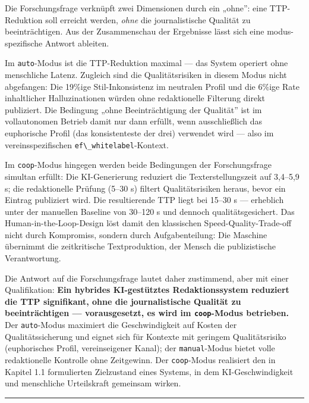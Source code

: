 Die Forschungsfrage verknüpft zwei Dimensionen durch ein „ohne'': eine
TTP-Reduktion soll erreicht werden, \emph{ohne} die journalistische
Qualität zu beeinträchtigen. Aus der Zusammenschau der Ergebnisse lässt
sich eine modus-spezifische Antwort ableiten.

Im \passthrough{\lstinline!auto!}-Modus ist die TTP-Reduktion maximal
--- das System operiert ohne menschliche Latenz. Zugleich sind die
Qualitätsrisiken in diesem Modus nicht abgefangen: Die 19\%ige
Stil-Inkonsistenz im neutralen Profil und die 6\%ige Rate inhaltlicher
Halluzinationen würden ohne redaktionelle Filterung direkt publiziert.
Die Bedingung „ohne Beeinträchtigung der Qualität'' ist im vollautonomen
Betrieb damit nur dann erfüllt, wenn ausschließlich das euphorische
Profil (das konsistenteste der drei) verwendet wird --- also im
vereinsspezifischen \passthrough{\lstinline!ef\_whitelabel!}-Kontext.

Im \passthrough{\lstinline!coop!}-Modus hingegen werden beide
Bedingungen der Forschungsfrage simultan erfüllt: Die KI-Generierung
reduziert die Texterstellungszeit auf 3,4--5,9 s; die redaktionelle
Prüfung (5--30 s) filtert Qualitätsrisiken heraus, bevor ein Eintrag
publiziert wird. Die resultierende TTP liegt bei 15--30 s --- erheblich
unter der manuellen Baseline von 30--120 s und dennoch
qualitätsgesichert. Das Human-in-the-Loop-Design löst damit den
klassischen Speed-Quality-Trade-off nicht durch Kompromiss, sondern
durch Aufgabenteilung: Die Maschine übernimmt die zeitkritische
Textproduktion, der Mensch die publizistische Verantwortung.

Die Antwort auf die Forschungsfrage lautet daher zustimmend, aber mit
einer Qualifikation: \textbf{Ein hybrides KI-gestütztes Redaktionssystem
reduziert die TTP signifikant, ohne die journalistische Qualität zu
beeinträchtigen --- vorausgesetzt, es wird im
\passthrough{\lstinline!coop!}-Modus betrieben.} Der
\passthrough{\lstinline!auto!}-Modus maximiert die Geschwindigkeit auf
Kosten der Qualitätssicherung und eignet sich für Kontexte mit geringem
Qualitätsrisiko (euphorisches Profil, vereinseigener Kanal); der
\passthrough{\lstinline!manual!}-Modus bietet volle redaktionelle
Kontrolle ohne Zeitgewinn. Der \passthrough{\lstinline!coop!}-Modus
realisiert den in Kapitel 1.1 formulierten Zielzustand eines Systems, in
dem KI-Geschwindigkeit und menschliche Urteilskraft gemeinsam wirken.

\begin{center}\rule{0.5\linewidth}{0.5pt}\end{center}

